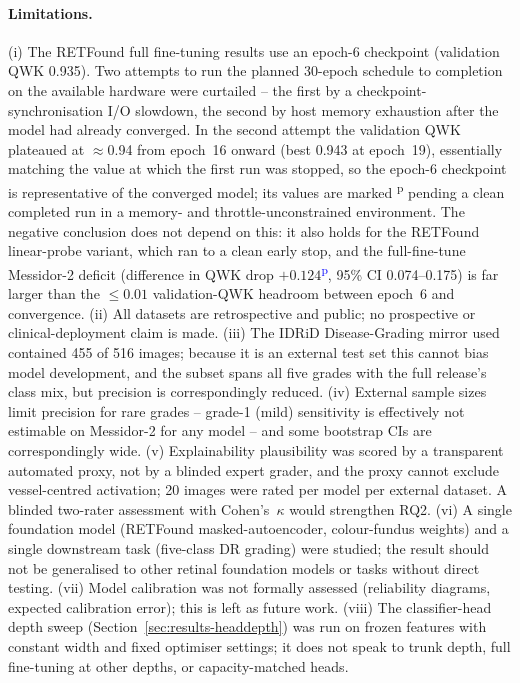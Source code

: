 \documentclass[11pt,a4paper]{article}
\newcommand{\prov}[1]{#1\textsuperscript{\textcolor{blue}{p}}} %
\begin{document}
\paragraph{Limitations.}
(i) The RETFound full fine-tuning results use an epoch-6 checkpoint (validation
QWK \num{0.935}). Two attempts to run the planned 30-epoch schedule to completion
on the available hardware were curtailed -- the first by a
checkpoint-synchronisation I/O slowdown, the second by host memory exhaustion
after the model had already converged. In the second attempt the validation QWK
plateaued at $\approx$\num{0.94} from epoch~16 onward (best \num{0.943} at
epoch~19), essentially matching the value at which the first run was stopped, so
the epoch-6 checkpoint is representative of the converged model; its values are
marked \textsuperscript{p} pending a clean completed run in a memory- and
throttle-unconstrained environment. The negative conclusion does not depend on
this: it also holds for the RETFound linear-probe variant, which ran to a clean
early stop, and the full-fine-tune Messidor-2 deficit (difference in QWK drop
\prov{$+0.124$}, 95\% CI \numrange{0.074}{0.175}) is far larger than the
$\leq \num{0.01}$ validation-QWK headroom between epoch~6 and convergence.
(ii) All datasets are retrospective and public; no prospective or
clinical-deployment claim is made.
(iii) The IDRiD Disease-Grading mirror used contained 455 of 516 images; because
it is an external test set this cannot bias model development, and the subset
spans all five grades with the full release's class mix, but precision is
correspondingly reduced.
(iv) External sample sizes limit precision for rare grades -- grade-1 (mild)
sensitivity is effectively not estimable on Messidor-2 for any model -- and some
bootstrap CIs are correspondingly wide.
(v) Explainability plausibility was scored by a transparent automated proxy, not
by a blinded expert grader, and the proxy cannot exclude vessel-centred
activation; 20 images were rated per model per external dataset. A blinded
two-rater assessment with Cohen's~$\kappa$ would strengthen RQ2.
(vi) A single foundation model (RETFound masked-autoencoder, colour-fundus
weights) and a single downstream task (five-class DR grading) were studied; the
result should not be generalised to other retinal foundation models or tasks
without direct testing.
(vii) Model calibration was not formally assessed (reliability diagrams, expected
calibration error); this is left as future work.
(viii) The classifier-head depth sweep (Section~\ref{sec:results-headdepth}) was run on
frozen features with constant width and fixed optimiser settings; it does not
speak to trunk depth, full fine-tuning at other depths, or capacity-matched heads.
\end{document}
